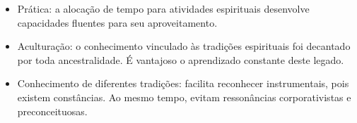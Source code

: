 \documentclass[a4paper]{article}
\begin{document}
\begin{itemize}
  \item Prática: a alocação de tempo para atividades espirituais desenvolve
  capacidades fluentes para seu aproveitamento.

  \item Aculturação: o conhecimento vinculado às tradições espirituais foi
  decantado por toda ancestralidade. É vantajoso o aprendizado constante deste
  legado.

  \item Conhecimento de diferentes tradições: facilita reconhecer instrumentais,
  pois existem constâncias. Ao mesmo tempo, evitam ressonâncias corporativistas
  e preconceituosas.
\end{itemize}
\end{document}
